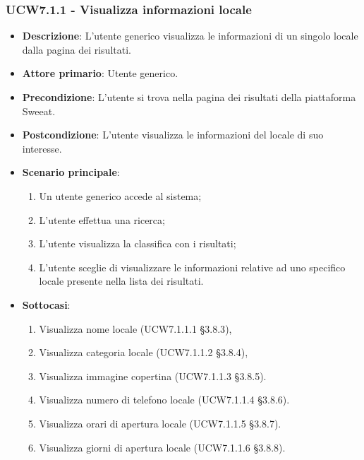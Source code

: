 \subsubsection{UCW7.1.1 - Visualizza informazioni locale}
\begin{itemize}
	\item \textbf{Descrizione}: L'utente generico visualizza le informazioni di un singolo locale dalla pagina dei risultati.
    \item \textbf{Attore primario}: Utente generico.
    \item \textbf{Precondizione}: L’utente si trova nella pagina dei risultati della piattaforma Sweeat.
    \item \textbf{Postcondizione}: L’utente visualizza le informazioni del locale di suo interesse.
    \item \textbf{Scenario principale}: 
    \begin{enumerate}
        \item Un utente generico accede al sistema;
        \item L’utente effettua una ricerca;
        \item L'utente visualizza la classifica con i risultati;
        \item L'utente sceglie di visualizzare le informazioni relative ad uno specifico locale presente nella lista dei risultati.
    \end{enumerate}
	\item \textbf{Sottocasi}:
    \begin{enumerate}
	\item Visualizza nome locale (UCW7.1.1.1 \S{3.8.3}),
	\item Visualizza categoria locale (UCW7.1.1.2 \S{3.8.4}), 
	\item Visualizza immagine copertina (UCW7.1.1.3 \S{3.8.5}).	
	\item Visualizza numero di telefono locale (UCW7.1.1.4 \S{3.8.6}).	
	\item Visualizza orari di apertura locale (UCW7.1.1.5 \S{3.8.7}).	
	\item Visualizza giorni di apertura locale (UCW7.1.1.6 \S{3.8.8}).			
	\end{enumerate}    
\end{itemize}

